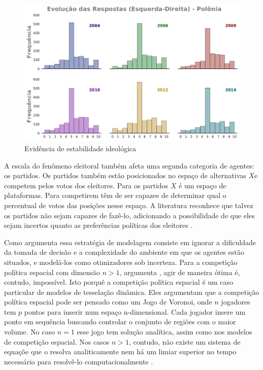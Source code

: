 \begin{figure}[H]
  \centering \includegraphics[width = \textwidth]{ims/ess_Pol_plots.pdf}
  \caption{Evidência de estabilidade ideológica}
\end{figure}

A escala do fenômeno eleitoral também afeta uma segunda categoria de agentes: os
partidos. Os partidos também estão posicionados no espaço de alternativas \(X\)e
competem pelos votos dos eleitores. Para os partidos \(X\) é um espaço de
plataformas. Para competirem têm de ser capazes de determinar qual o percentual
de votos das posições nesse espaço. A literatura reconhece que talvez os
partidos não sejam capazes de fazê-lo, adicionando a possibilidade de que eles
sejam incertos quanto as preferências políticas dos eleitores
\cite{glazer1989model, grofman2004downs}.


Como argumenta  essa estratégia de modelagem
consiste em ignorar a dificuldade da tomada de decisão e a complexidade do
ambiente em que os agentes estão situados, e modelá-los como otimizadores sob
incerteza. Para a competição política espacial com dimensão $n>1$, argumenta
, agir de maneira ótima é, contudo, impossível. Isto
porquê a competição política espacial é um caso particular de modelos de
tesselação dinâmica. Eles argumentam que a competição política espacial pode ser
pensado como um Jogo de Voronoi, onde \(n\) jogadores tem \(p\) pontos para
inserir num espaço n-dimensional. Cada jogador insere um ponto em sequência
buscando controlar o conjunto de regiões com o maior volume. No caso \(n=1\)
esse jogo tem solução analítica, assim como nos modelos de competição espacial.
Nos casos \(n>1\), contudo, não existe um sistema de equaçõe que o resolva
analiticamente nem há um limiar superior no tempo necessário para resolvê-lo
computacionalmente \cite[p.24]{laver2011party}.

